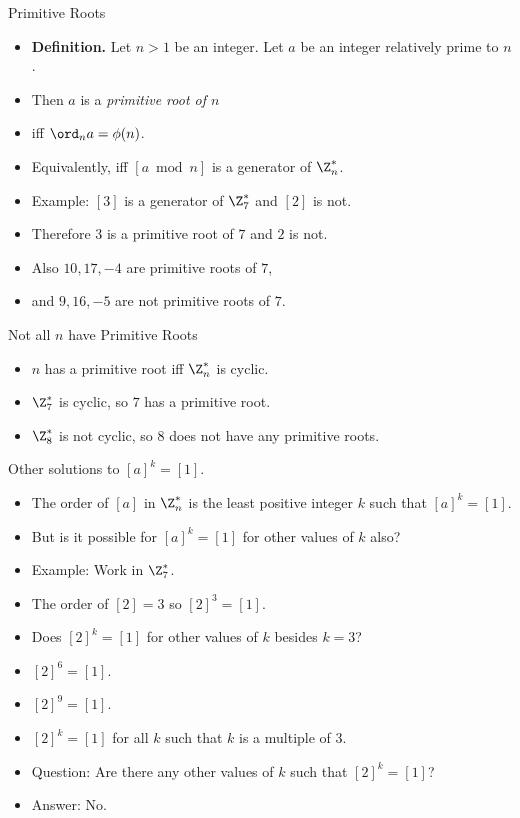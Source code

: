 \documentclass[handout]{beamer}
\begin{document}
\begin{frame}{Primitive Roots}

\begin{itemize}
  \item \textbf{Definition.} Let $n>1$ be an integer. Let $a$ be an integer relatively prime to $n$.
  \item Then $a$ is a \emph{primitive root of $n$}
  \item iff $\ord_n a = \phi(n)$.
  \item Equivalently, iff $[a \bmod n]$ is a generator of $\Z_n^*$.
  \item Example: $[3]$ is a generator of $\Z_7^*$ and $[2]$ is not.
  \item Therefore $3$ is a primitive root of $7$ and $2$ is not.
  \item Also $10, 17, -4$ are primitive roots of $7$,
  \item and $9, 16, -5$ are not primitive roots of $7$.
\end{itemize}

\end{frame}

\begin{frame}{Not all $n$ have Primitive Roots}

\begin{itemize}
  \item $n$ has a primitive root iff $\Z_n^*$ is cyclic.
  \item $\Z_7^*$ is cyclic, so $7$ has a primitive root.
  \item $\Z_8^*$ is not cyclic, so $8$ does not have any primitive roots.
\end{itemize}

\end{frame}

\begin{frame}{Other solutions to $[a]^k = [1]$.}

\begin{itemize}
  \item The order of $[a]$ in $\Z_n^*$ is the least positive integer $k$ such that
  $[a]^k = [1]$.
  \item But is it possible for $[a]^k = [1]$ for other values of $k$ also?
  \item Example: Work in $\Z_7^*$.
  \item The order of $[2] = 3$ so $[2]^3 = [1]$.
  \item Does $[2]^k = [1]$ for other values of $k$ besides $k=3$?
  \item $[2]^6 = [1]$.
  \item $[2]^9 = [1]$.
  \item $[2]^k = [1]$ for all $k$ such that $k$ is a multiple of 3.
  \item Question: Are there any other values of $k$ such that $[2]^k = [1]$?
  \item Answer: No.
\end{itemize}
\end{frame}
\end{document}
